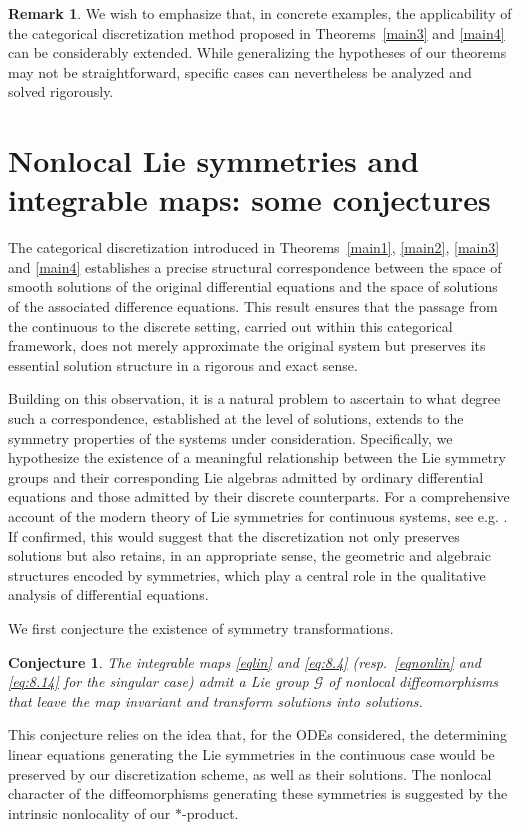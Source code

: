 \documentclass[10pt]{amsart}
\numberwithin{equation}{section}
\newtheorem{conjecture}{Conjecture}
\theoremstyle{definition}
\newtheorem{remark}{\textbf{Remark}}
\begin{document}
\begin{remark}
\label{rem6}
We wish to emphasize that, in concrete examples, the applicability of the
categorical discretization method proposed in Theorems~\ref{main3} and \ref{main4} can be considerably extended. While generalizing the hypotheses
of our theorems may not be straightforward, specific cases can nevertheless
be analyzed and solved rigorously.
\end{remark}

\section{Nonlocal Lie symmetries and integrable maps: some conjectures}
\label{sec9}



The categorical discretization introduced in Theorems~\ref{main1},
\ref{main2}, \ref{main3} and \ref{main4} establishes a precise structural
correspondence between the space of smooth solutions of the original differential
equations and the space of solutions of the associated difference equations.
This result ensures that the passage from the continuous to the discrete
setting, carried out within this categorical framework, does not merely
approximate the original system but preserves its essential solution structure
in a rigorous and exact sense.

Building on this observation, it is a natural problem to ascertain to what degree such a correspondence, established at the level of solutions,
extends to the symmetry properties of the systems under consideration.
Specifically, we hypothesize the existence of a meaningful relationship
between the Lie symmetry groups and their corresponding Lie algebras admitted
by ordinary differential equations and those admitted by their discrete counterparts.
For a comprehensive account of the modern theory of Lie symmetries for
continuous systems, see e.g. \cite{olver}. If confirmed, this would suggest
that the discretization not only preserves solutions but also retains,
in an appropriate sense, the geometric and algebraic structures encoded
by symmetries, which play a central role in the qualitative analysis of
differential equations.



We first conjecture the existence of symmetry transformations.
\begin{conjecture}
\label{conj1}
The integrable maps  \eqref{eqlin} and  \eqref{eq:8.4} (resp.~\eqref{eqnonlin}
and  \eqref{eq:8.14} for the singular case) admit a Lie group
$\mathcal{G}$ of nonlocal diffeomorphisms that leave the map invariant
and transform solutions into solutions.
\end{conjecture}
This conjecture relies on the idea that, for the ODEs considered, the determining
linear equations generating the Lie symmetries in the continuous case would
be preserved by our discretization scheme, as well as their solutions.
The nonlocal character of the diffeomorphisms generating these symmetries
is suggested by the intrinsic nonlocality of our $*$-product.
\end{document}
